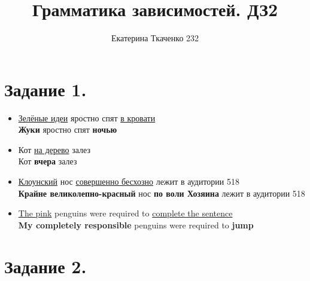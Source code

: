\documentclass[14pt,extrafontsizes]{article}
\title{Грамматика зависимостей. ДЗ2}
\author{Екатерина Ткаченко 232}
\begin{document}
\maketitle
\section*{Задание 1.}
\begin{itemize}
    \item \underline{Зелёные идеи} яростно спят \underline{в кровати}\\
    \textbf{Жуки} яростно спят \textbf{ночью}
    \item Кот \underline{на дерево} залез\\
    Кот \textbf{вчера} залез
    \item \underline{Клоунский} нос \underline{совершенно бесхозно} лежит в аудитории 518\\
    \textbf{Крайне великолепно-красный} нос \textbf{по воли 
    Хозяина} лежит в аудитории 518
    \item \underline{The pink} penguins were required to \underline{complete the sentence}\\
    \textbf{My completely responsible} penguins were required to \textbf{jump}
\end{itemize}

\section*{Задание 2.}
\end{document}
